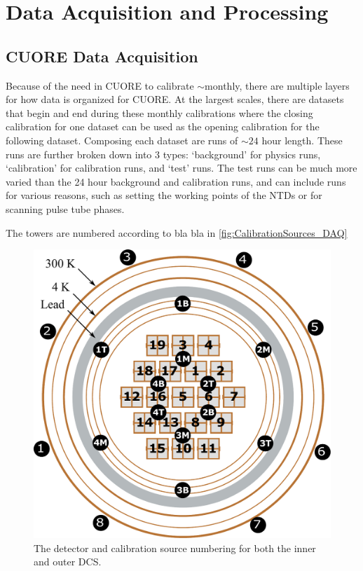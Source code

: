 \chapter{Data Acquisition and Processing}
\label{ch:Data Acquisition and Processing}

\section{CUORE Data Acquisition}
Because of the need in CUORE to calibrate $\sim$monthly, there are multiple layers for how data is organized for CUORE.
At the largest scales, there are datasets that begin and end during these monthly calibrations where the closing calibration for one dataset can be used as the opening calibration for the following dataset.
Composing each dataset are runs of $\sim24$ hour length.
These runs are further broken down into 3 types: `background' for physics runs, `calibration' for calibration runs, and `test' runs.
The test runs can be much more varied than the 24 hour background and calibration runs, and can include runs for various reasons, such as setting the working points of the NTDs or for scanning pulse tube phases.

The towers are numbered according to bla bla in \autoref{fig:CalibrationSources_DAQ}


\begin{figure}
    \centering
    \includegraphics[width= 4 in, height = 4 in, keepaspectratio]{Figures/CalibrationSources_DAQ.pdf}
    \caption[The detector and calibration source numbering for both the inner and outer DCS.]
    {The detector and calibration source numbering for both the inner and outer DCS.}
    \label{fig:CalibrationSources_DAQ}
\end{figure}


